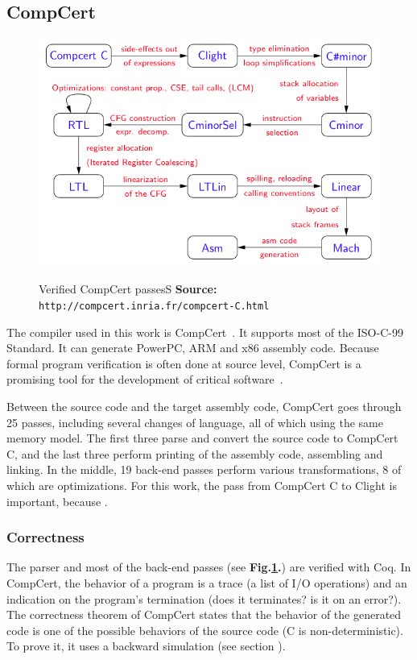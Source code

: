 \subsection{CompCert}
\begin{center}
\begin{figure}
\includegraphics[scale=1]{img/passes.png}
\label{fig:compcertpasses}
\caption{Verified CompCert passes\hspace{\linewidth}S \textbf{Source: }\texttt{http://compcert.inria.fr/compcert-C.html}}
\end{figure}
\end{center}

The compiler used in this work is CompCert~\cite{compcertmanual}.
It supports most of the ISO-C-99 Standard.
It can generate PowerPC, ARM and x86 assembly code.
Because formal program verification is often done at source level, CompCert is a promising tool for the development of critical software~\cite{bedinfranca:hal-00653367}.

Between the source code and the target assembly code, CompCert goes through 25 passes, including several changes of language, all of which using the same memory model.
The first three parse and convert the source code to CompCert C, and the last three perform printing of the assembly code, assembling and linking.
In the middle, 19 back-end passes perform various transformations, 8 of which are optimizations.
For this work, the pass from CompCert C to Clight is important, because .

\subsubsection{Correctness}
The parser and most of the back-end passes (see \textbf{Fig.\ref{fig:compcertpasses}.}) are verified with Coq.
In CompCert, the behavior of a program is a trace (a list of I/O operations) and an indication on the program's termination (does it terminates? is it on an error?). %
The correctness theorem of CompCert states that the behavior of the generated code is one of the possible behaviors of the source code (C is non-deterministic). To prove it, it uses a backward simulation (see section ).

